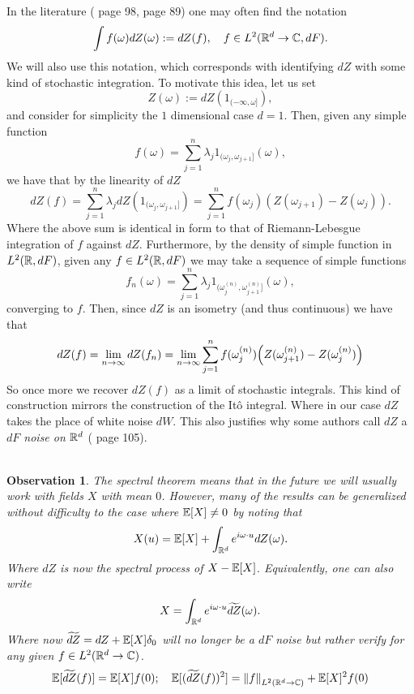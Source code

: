 \documentclass[12pt]{article}
\newtheorem{observation}{Observation}
\begin{document}
In the literature (\cite{yaglom1987correlation} page 98, \cite{lindgren2012stationary} page 89) one may often find the notation
\begin{equation*}
	\int f(\omega)dZ(\omega):=dZ(f),\quad f\in L^2({\mathbb R}^d\to\mathbb{C},dF).
\end{equation*}
We will also use this notation, which corresponds with identifying $dZ$ with some kind of stochastic integration. To motivate this idea, let us set
\begin{equation}\label{Z def}
	Z(\omega):=dZ(1_{(-\infty,\omega]}),
\end{equation}
and consider for simplicity the $1$ dimensional case $d=1$. Then, given any simple function
$$f(\omega)=\sum_{j=1}^{n}  \lambda_{j} 1_{(\omega_j,\omega_{j+1}]}(\omega),$$
we have that by the linearity of $dZ$
\begin{equation*}
	dZ(f)=\sum_{j=1}^n\lambda_j dZ(1_{(\omega_j,\omega_{j+1}]})=\sum_{j=1}^n f(\omega_j) (Z(\omega_{j+1})-Z(\omega_j)).
\end{equation*}
Where the above sum is identical in form to that of Riemann-Lebesgue integration of $f$ against $dZ$. Furthermore, by the density of simple function in $L^2({\mathbb R},dF)$, given any $f\in L^2({\mathbb R},dF)$ we may take a sequence of simple functions $$f_n(\omega)=\sum_{j=1}^{n}  \lambda_{j} 1_{(\omega_j^{(n)},\omega^{(n)}_{j+1}]}(\omega),$$ converging to $f$. Then, since $dZ$ is an isometry (and thus continuous) we have that
\begin{equation}\label{approx stoch int}
	dZ(f)=\lim_{n\to\infty} dZ(f_n)=\lim_{n\to\infty}\sum_{j=1}^n f(\omega^{(n)}_j)\qty (Z(\omega^{(n)}_{j+1})-Z(\omega^{(n)}_j))
\end{equation}
So once more we recover $dZ(f)$ as a limit of stochastic integrals. This kind of construction mirrors the construction of the Itô integral. Where in our case $dZ$ takes the place of white noise $dW$. This also justifies why some authors call $dZ$ a \emph{$dF$ noise on ${\mathbb R}^d$} (\cite{adler2007random} page 105).\\
\\
\begin{observation}\label{obs 1}
	The spectral theorem means that in the future we will usually work with fields $X$ with mean $0$. However, many of the results can be generalized without difficulty to the case where $\mathbb{E}[X]\neq 0$ by noting that
	\begin{equation*}
		X(u)=\mathbb{E}[X]+\int_{{\mathbb R}^d}e^{i\omega\cdot u}dZ(\omega).
	\end{equation*}
	Where $dZ$ is now the spectral process of $X-\mathbb{E}[X]$. Equivalently, one can also write
	\begin{equation*}
		X=\int_{{\mathbb R}^d}e^{i\omega\cdot u}\widetilde{dZ}(\omega).
	\end{equation*}
	Where now $\widetilde{dZ}=dZ+\mathbb{E}[X]\delta_0$ will no longer be a $dF$ noise but rather verify for any given $f\in L^2({\mathbb R}^d\to\mathbb{C})$.
	\begin{equation*}
		\mathbb{E}[\widetilde{dZ}(f)]=\mathbb{E}[X]f(0);\quad \mathbb{E}[(\widetilde{dZ}(f))^2]=\norm{f}_{L^2({\mathbb R}^d\to\mathbb{C})}+\mathbb{E}[X]^2f(0)
	\end{equation*}
\end{observation}
\end{document}

